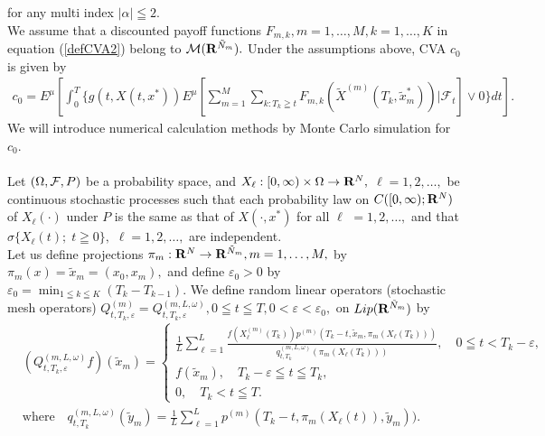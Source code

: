 \documentclass[12pt]{article}
\begin{document}
for any multi index $|\alpha|\leqq 2.$
\\
We assume that a discounted payoff functions $F_{m,k}, m=1,\ldots, M, k=1,\ldots,K$ in equation (\ref{defCVA2}) 
belong to ${\cal M}({\bf R}^{\tilde{N}_m}).$
Under the assumptions above, CVA $c_0$ is given by 
\begin{align}
c_0 = E^{\mu}[\int_{0}^T \{ g(t,X(t,x^*)) 
E^{\mu}[ \sum_{m=1}^M \sum_{k:T_k\geqq t} F_{m,k}(\tilde{X}^{(m)}(T_k, \tilde{x}^*_m)) |\mathcal{F}_t] \vee0\}dt ].
\end{align}
We will introduce numerical calculation methods by Monte Carlo simulation for $c_0$.\\
\\
Let $(\Omega ,{\cal F},P)$ be a probability space,
and $X_{\ell }:[0,\infty )\times \Omega \to {\bf R}^N,$ 
$\ell =1,2,\ldots ,$ be continuous stochastic processes such that 
each probability law on $C([0,\infty );{\bf R}^N)$ of
$X_{\ell}(\cdot )$ under $P$ is the same as  that of $X(\cdot ,{x}^*)$  for all $\ell$ $=1,2,\ldots ,$ and that
$\sigma \{ X_{\ell}(t); \; t\geqq 0\},$ $\ell =1,2,\ldots ,$ are independent.\\
Let us define projections $\pi_m: {\bf R}^N \to {\bf R}^{\tilde{N}_m}, m=1,\ldots,M,$ by
$ \pi_m(x)= \tilde{x}_m=(x_0,x_m),$ 
and define $\varepsilon_0 >0$ by
$\varepsilon_0 =\min_{1\leqq k \leqq K}(T_k-T_{k-1}).$
We define random linear operators (stochastic mesh operators)
 $Q_{t,T_k,\varepsilon}^{(m)}=Q_{t,T_k,\varepsilon}^{(m,L,\omega)}, 0 \leqq t \leqq T, 0 < \varepsilon <\varepsilon_0,$ 
on $Lip({\bf R}^{\tilde{N}_m})$ by
\begin{align*}
&(Q_{t,T_k,\varepsilon}^{(m,L,\omega)}f)(\tilde{x}_m)
=
\begin{cases}
\frac{1}{L} \sum_{\ell=1}^L \frac{f(X_{\ell}^{(m)}(T_k))p^{(m)}(T_k-t, \tilde{x}_m, \pi_m( X_{\ell}(T_k)))}{q_{t,T_k}^{(m,L,\omega)}(\pi_m (X_{\ell}(T_k)))}, 
\quad 0 \leqq t < T_k-\varepsilon ,\\
f(\tilde{x}_m), \quad T_k - \varepsilon \leqq t \leqq T_k, \\
0, \quad T_k < t \leqq T .
\end{cases}\\
&\text{where} \quad q_{t,T_k}^{(m,L,\omega)}(\tilde{y}_m)=\frac{1}{L}\sum_{\ell=1}^L p^{(m)}(T_k-t, \pi_m(X_{\ell}(t)), \tilde{y}_m)).
\end{align*}
\end{document}
